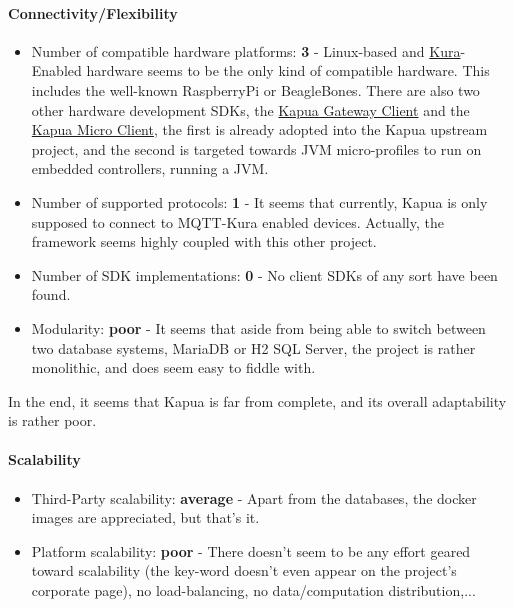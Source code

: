 \documentclass{article}
\begin{document}
\paragraph{Connectivity/Flexibility}

\begin{itemize}
\item Number of compatible hardware platforms: \textbf{3} - Linux-based and \href{https://www.eclipse.org/kura/}{Kura}-Enabled hardware seems to be the only kind of compatible hardware. This includes the well-known RaspberryPi or BeagleBones. There are also two other hardware development SDKs, the \href{https://github.com/ctron/kapua-gateway-client}{Kapua Gateway Client} and the \href{https://github.com/ctron/kapua-micro-client}{Kapua Micro Client}, the first is already adopted into the Kapua upstream project, and the second is targeted towards JVM micro-profiles to run on embedded controllers, running a JVM.
\item Number of supported protocols: \textbf{1} - It seems that currently, Kapua is only supposed to connect to MQTT-Kura enabled devices. Actually, the framework seems highly coupled with this other project.
\item Number of SDK implementations: \textbf{0} - No client SDKs of any sort have been found.
\item Modularity: \textbf{poor} - It seems that aside from being able to switch between two database systems, MariaDB or H2 SQL Server, the project is rather monolithic, and does seem easy to fiddle with.
\end{itemize}

In the end, it seems that Kapua is far from complete, and its overall adaptability is rather poor.

\paragraph{Scalability}

\begin{itemize}
\item Third-Party scalability: \textbf{average} - Apart from the databases, the docker images are appreciated, but that's it.
\item Platform scalability: \textbf{poor} - There doesn't seem to be any effort geared toward scalability (the key-word doesn't even appear on the project's corporate page), no load-balancing, no data/computation distribution,...
\end{itemize}
\end{document}
